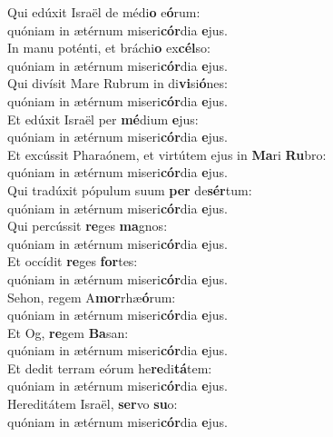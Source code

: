 \evenverse Qui edúxit Israël de médi\textbf{o} e\textbf{ó}rum:~\*\\
\evenverse quóniam in ætérnum miseri\textbf{cór}dia \textbf{e}jus.\\
\oddverse In manu poténti, et bráchi\textbf{o} ex\textbf{cél}so:~\*\\
\oddverse quóniam in ætérnum miseri\textbf{cór}dia \textbf{e}jus.\\
\evenverse Qui divísit Mare Rubrum in di\textbf{vi}si\textbf{ó}nes:~\*\\
\evenverse quóniam in ætérnum miseri\textbf{cór}dia \textbf{e}jus.\\
\oddverse Et edúxit Israël per \textbf{mé}dium \textbf{e}jus:~\*\\
\oddverse quóniam in ætérnum miseri\textbf{cór}dia \textbf{e}jus.\\
\evenverse Et excússit Pharaónem, et virtútem ejus in \textbf{Ma}ri \textbf{Ru}bro:~\*\\
\evenverse quóniam in ætérnum miseri\textbf{cór}dia \textbf{e}jus.\\
\oddverse Qui tradúxit pópulum suum \textbf{per} de\textbf{sér}tum:~\*\\
\oddverse quóniam in ætérnum miseri\textbf{cór}dia \textbf{e}jus.\\
\evenverse Qui percússit \textbf{re}ges \textbf{ma}gnos:~\*\\
\evenverse quóniam in ætérnum miseri\textbf{cór}dia \textbf{e}jus.\\
\oddverse Et occídit \textbf{re}ges \textbf{for}tes:~\*\\
\oddverse quóniam in ætérnum miseri\textbf{cór}dia \textbf{e}jus.\\
\evenverse Sehon, regem A\textbf{mor}rhæ\textbf{ó}rum:~\*\\
\evenverse quóniam in ætérnum miseri\textbf{cór}dia \textbf{e}jus.\\
\oddverse Et Og, \textbf{re}gem \textbf{Ba}san:~\*\\
\oddverse quóniam in ætérnum miseri\textbf{cór}dia \textbf{e}jus.\\
\evenverse Et dedit terram eórum he\textbf{re}di\textbf{tá}tem:~\*\\
\evenverse quóniam in ætérnum miseri\textbf{cór}dia \textbf{e}jus.\\
\oddverse Hereditátem Israël, \textbf{ser}vo \textbf{su}o:~\*\\
\oddverse quóniam in ætérnum miseri\textbf{cór}dia \textbf{e}jus.\\
